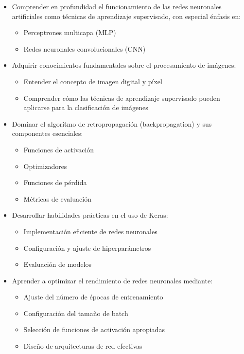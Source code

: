 \documentclass[11pt,a4paper]{article}
\begin{document}
\begin{itemize}
    \item Comprender en profundidad el funcionamiento de las redes neuronales artificiales como técnicas de aprendizaje supervisado, con especial énfasis en:
    \begin{itemize}
        \item Perceptrones multicapa (MLP)
        \item Redes neuronales convolucionales (CNN)
    \end{itemize}

    \item Adquirir conocimientos fundamentales sobre el procesamiento de imágenes:
    \begin{itemize}
        \item Entender el concepto de imagen digital y píxel
        \item Comprender cómo las técnicas de aprendizaje supervisado pueden aplicarse para la clasificación de imágenes
    \end{itemize}

    \item Dominar el algoritmo de retropropagación (backpropagation) y sus componentes esenciales:
    \begin{itemize}
        \item Funciones de activación
        \item Optimizadores
        \item Funciones de pérdida
        \item Métricas de evaluación
    \end{itemize}

    \item Desarrollar habilidades prácticas en el uso de Keras:
    \begin{itemize}
        \item Implementación eficiente de redes neuronales
        \item Configuración y ajuste de hiperparámetros
        \item Evaluación de modelos
    \end{itemize}

    \item Aprender a optimizar el rendimiento de redes neuronales mediante:
    \begin{itemize}
        \item Ajuste del número de épocas de entrenamiento
        \item Configuración del tamaño de batch
        \item Selección de funciones de activación apropiadas
        \item Diseño de arquitecturas de red efectivas
    \end{itemize}


\end{itemize}
\end{document}
